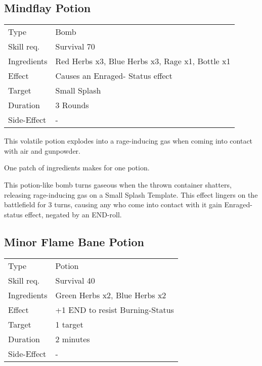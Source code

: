 \documentclass[11pt,a4paper,twocolumn]{book}
\begin{document}
\subsection*{Mindflay Potion}
{
	\begin{tabu} to 75mm{| X[l,4] | X[l,8] |}
		\hline
		Type 			& Bomb 														\\
		Skill req.	    & Survival 70 												\\
		Ingredients     & Red Herbs x3, Blue Herbs x3, Rage x1, Bottle x1			\\
		Effect     		& Causes an Enraged- Status effect 							\\
		Target      	& Small Splash													\\
		Duration  		& 3 Rounds 												\\
		Side-Effect     & -															\\ \hline
	\end{tabu}
	
}

\medskip

This volatile potion explodes into a rage-inducing gas when coming into contact with air and gunpowder.

One patch of ingredients makes for one potion.

This potion-like bomb turns gaseous when the thrown container shatters, releasing rage-inducing gas on a Small Splash Template. This effect lingers on the battlefield for 3 turns, causing any who come into contact with it gain Enraged- status effect, negated by an END-roll.


\subsection*{Minor Flame Bane Potion}
{
	\begin{tabu} to 75mm{| X[l,4] | X[l,8] |}
		\hline
		Type 			& Potion 													\\
		Skill req.	    & Survival 40 												\\
		Ingredients     & Green Herbs x2, Blue Herbs x2								\\
		Effect     		& +1 END to resist Burning-Status 							\\
		Target      	& 1 target													\\
		Duration  		& 2 minutes	 												\\
		Side-Effect     & -															\\ \hline
	\end{tabu}
	
}
\end{document}
